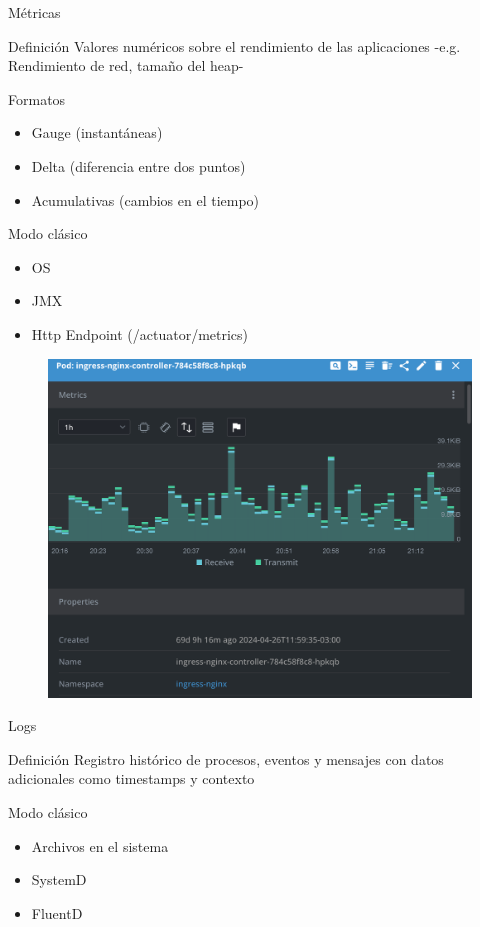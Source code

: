 \documentclass[aspectratio=169]{beamer}
\begin{document}
	\begin{frame}{Métricas}
		
		\begin{block}{Definición}
			Valores numéricos sobre el rendimiento de las aplicaciones -e.g. Rendimiento de red, tamaño del heap-
		\end{block}	
		Formatos
		\begin{itemize}
			\item Gauge (instantáneas)
			\item Delta (diferencia entre dos puntos)
			\item Acumulativas (cambios en el tiempo)
		\end{itemize}
		
		Modo clásico
		\begin{itemize}
			\item OS
			\item JMX
			\item Http Endpoint (/actuator/metrics)
		\end{itemize}	
	\end{frame}
	
	\begin{frame}
		\begin{figure}
			\centering
			\includegraphics[width=0.7\linewidth]{Images/metrics-sample}
			\label{fig:metrics-sample}
		\end{figure}
	\end{frame}
	
	\begin{frame}{Logs}
		
		\begin{block}{Definición}
			Registro histórico de procesos, eventos y mensajes con datos adicionales como timestamps y contexto
		\end{block}	
		Modo clásico
		\begin{itemize}
			\item Archivos en el sistema
			\item SystemD
			\item FluentD
		\end{itemize}	
	\end{frame}
	
\end{document}
